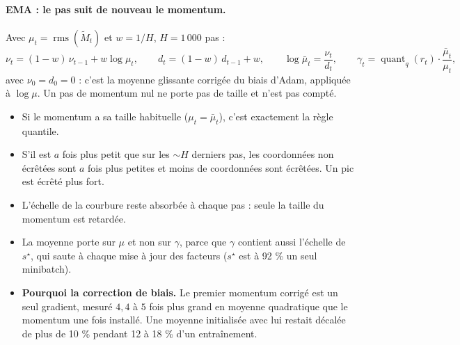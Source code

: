 \documentclass[11pt,a4paper]{article}
\newcommand{\Mt}{\widetilde{M}}
\DeclareMathOperator{\rms}{rms}
\begin{document}
\paragraph{EMA : le pas suit de nouveau le momentum.}
Avec $\mu_t = \rms(\Mt_t)$ et $w = 1/H$, $H = 1\,000$ pas :
\[
  \nu_t = (1-w)\,\nu_{t-1} + w\log\mu_t, \qquad
  d_t = (1-w)\,d_{t-1} + w, \qquad
  \log\bar\mu_t = \frac{\nu_t}{d_t}, \qquad
  \gamma_t = \operatorname{quant}_q(r_t)\cdot\frac{\bar\mu_t}{\mu_t},
\]
avec $\nu_0 = d_0 = 0$ : c'est la moyenne glissante corrigée du biais d'Adam, appliquée à $\log\mu$.
Un pas de momentum nul ne porte pas de taille et n'est pas compté.
\begin{itemize}
  \item Si le momentum a sa taille habituelle ($\mu_t = \bar\mu_t$), c'est exactement la règle
        quantile.
  \item S'il est $a$ fois plus petit que sur les $\sim H$ derniers pas, les coordonnées non écrêtées
        sont $a$ fois plus petites et moins de coordonnées sont écrêtées. Un pic est écrêté plus fort.
  \item L'échelle de la courbure reste absorbée à chaque pas : seule la taille du momentum est
        retardée.
  \item La moyenne porte sur $\mu$ et non sur $\gamma$, parce que $\gamma$ contient aussi l'échelle de
        $s^\star$, qui saute à chaque mise à jour des facteurs ($s^\star$ est à 92 \% un seul
        minibatch).
  \item \textbf{Pourquoi la correction de biais.} Le premier momentum corrigé est un seul gradient,
        mesuré $4{,}4$ à $5$ fois plus grand en moyenne quadratique que le momentum une fois installé.
        Une moyenne initialisée avec lui restait décalée de plus de 10 \% pendant 12 à 18 \% d'un
        entraînement.
\end{itemize}
\end{document}
